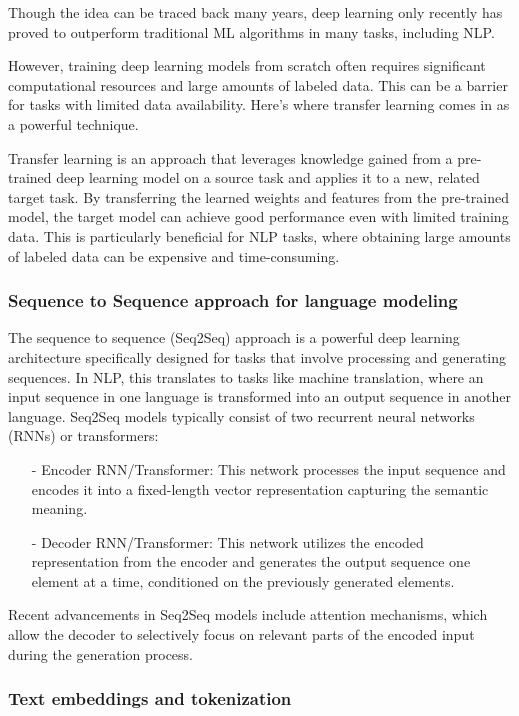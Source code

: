 \documentclass[15pt]{article}
\begin{document}
Though the idea can be traced back many years, deep learning only recently has proved to outperform traditional ML algorithms in many tasks, including NLP.

However, training deep learning models from scratch often requires significant computational resources and large amounts of labeled data. This can be a barrier for tasks with limited data availability. Here's where transfer learning comes in as a powerful technique.

Transfer learning is an approach that leverages knowledge gained from a pre-trained deep learning model on a source task and applies it to a new, related target task. By transferring the learned weights and features from the pre-trained model, the target model can achieve good performance even with limited training data. This is particularly beneficial for NLP tasks, where obtaining large amounts of labeled data can be expensive and time-consuming.

\subsubsection{Sequence to Sequence approach for language modeling}

The sequence to sequence (Seq2Seq) approach is a powerful deep learning architecture specifically designed for tasks that involve processing and generating sequences. In NLP, this translates to tasks like machine translation, where an input sequence in one language is transformed into an output sequence in another language. Seq2Seq models typically consist of two recurrent neural networks (RNNs) or transformers:
\begin{enumerate}
    \item[-] Encoder RNN/Transformer: This network processes the input sequence and encodes it into a fixed-length vector representation capturing the semantic meaning.
    \item[-] Decoder RNN/Transformer: This network utilizes the encoded representation from the encoder and generates the output sequence one element at a time, conditioned on the previously generated elements.
\end{enumerate}

Recent advancements in Seq2Seq models include attention mechanisms, which allow the decoder to selectively focus on relevant parts of the encoded input during the generation process.

\subsubsection{Text embeddings and tokenization}
\end{document}
